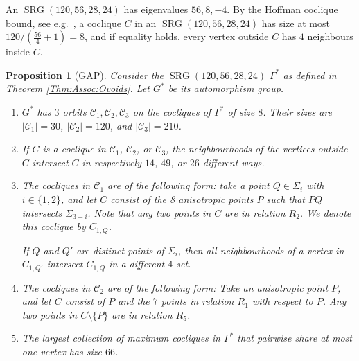 \documentclass[a4paper]{article}
\newtheorem{prop}[thm]{Proposition}
\theoremstyle{definition}
\newcommand{\mc}{\mathcal C}
\DeclareMathOperator{\SRG}{SRG}
\begin{document}
An $\SRG(120,56,28,24)$ has eigenvalues $56, 8, -4$.
By the Hoffman coclique bound, see e.g.\ \cite[Proposition 1.1.7]{Brouwer:VanMaldeghem}, a coclique $C$ in an $\SRG(120,56,28,24)$ has size at most %
$120 /( \frac{56}4 +1) = 8$, and if equality holds, every vertex outside $C$ has $4$ neighbours inside $C$.

\begin{prop}[GAP]
 \label{Prop:Cocliques}
 Consider the $\SRG(120,56,28,24)$ $\Gamma^*$ as defined in Theorem \ref{Thm:Assoc:Ovoids}.
 Let $G^*$ be its automorphism group.
 \begin{enumerate}
  \item $G^*$ has $3$ orbits $\mc_1, \mc_2, \mc_3$ on the cocliques of $\Gamma^*$ of size $8$.
  Their sizes are $|\mc_1| = 30$, $|\mc_2| = 120$, and $|\mc_3| = 210$.
  \item \label{item:nb} If $C$ is a coclique in $\mc_1$, $\mc_2$, or $\mc_3$, the neighbourhoods of the vertices outside $C$ intersect $C$ in respectively $14$, $49$, or $26$ different ways.
  \item \label{item:C1} The cocliques in $\mc_1$ are of the following form: take a point $Q \in \Sigma_i$ with $i \in \{1,2\}$, and let $C$ consist of the 8 anisotropic points $P$ such that $PQ$ intersects $\Sigma_{3-i}$.
  Note that any two points in $C$ are in relation $R_2$.
  We denote this coclique by $C_{1,Q}$.

  If $Q$ and $Q'$ are distinct points of $\Sigma_i$, then all neighbourhoods of a vertex in $C_{1,Q'}$ intersect $C_{1,Q}$ in a different $4$-set.
  \item The cocliques in $\mc_2$ are of the following form:
  Take an anisotropic point $P$, and let $C$ consist of $P$ and the $7$ points in relation $R_1$ with respect to $P$.
  Any two points in $C \setminus \{P\}$ are in relation $R_5$.

  \item \label{item:pg} The largest collection of maximum cocliques in $\Gamma^*$ that pairwise share at most one vertex has size $66$.
 \end{enumerate}
\end{prop}
\end{document}
